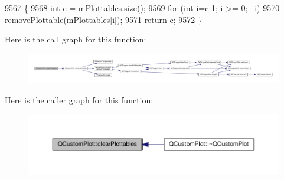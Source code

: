 \begin{DoxyCode}
9567 \{
9568   \textcolor{keywordtype}{int} \hyperlink{_comparision_pictures_2_createtest_image_8m_ae0323a9039add2978bf5b49550572c7c}{c} = \hyperlink{class_q_custom_plot_a62bf8e4e7f8d23fc1e9301ba0148269f}{mPlottables}.size();
9569   \textcolor{keywordflow}{for} (\textcolor{keywordtype}{int} \hyperlink{_comparision_pictures_2_createtest_image_8m_a6f6ccfcf58b31cb6412107d9d5281426}{i}=c-1; \hyperlink{_comparision_pictures_2_createtest_image_8m_a6f6ccfcf58b31cb6412107d9d5281426}{i} >= 0; --\hyperlink{_comparision_pictures_2_createtest_image_8m_a6f6ccfcf58b31cb6412107d9d5281426}{i})
9570     \hyperlink{class_q_custom_plot_af3dafd56884208474f311d6226513ab2}{removePlottable}(\hyperlink{class_q_custom_plot_a62bf8e4e7f8d23fc1e9301ba0148269f}{mPlottables}[\hyperlink{_comparision_pictures_2_createtest_image_8m_a6f6ccfcf58b31cb6412107d9d5281426}{i}]);
9571   \textcolor{keywordflow}{return} \hyperlink{_comparision_pictures_2_createtest_image_8m_ae0323a9039add2978bf5b49550572c7c}{c};
9572 \}
\end{DoxyCode}


Here is the call graph for this function\+:\nopagebreak
\begin{figure}[H]
\begin{center}
\leavevmode
\includegraphics[width=350pt]{class_q_custom_plot_a9a409bb3201878adb7ffba1c89c4e004_cgraph}
\end{center}
\end{figure}




Here is the caller graph for this function\+:\nopagebreak
\begin{figure}[H]
\begin{center}
\leavevmode
\includegraphics[width=350pt]{class_q_custom_plot_a9a409bb3201878adb7ffba1c89c4e004_icgraph}
\end{center}
\end{figure}


\hypertarget{class_q_custom_plot_af73057345656cbd1463454982d808b00}{}
